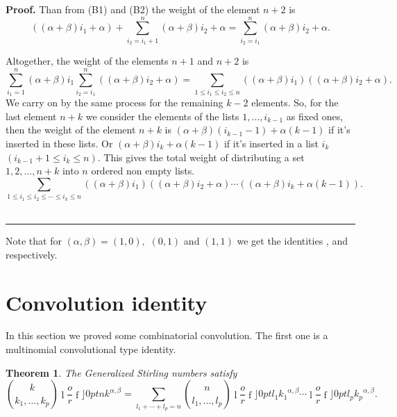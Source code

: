\documentclass{article}
\newcommand {\lah}[2]{\genfrac\lfloor \rfloor{0pt}{}{#1}{#2}}
\newtheorem{theorem}{Theorem}
\newenvironment{proof}[1][Proof]{\noindent\textbf{#1.} }{\ \rule{0.5em}{0.5em}}
\begin{document}
\begin{proof}
Than from (B1) and (B2) the weight of the element $n+2$ is
  \begin{equation*}
  \left( \left( \alpha +\beta \right) i_{1}+\alpha \right) +\sum_{i_{2}=i_{1}+1}^{n}\left( \alpha +\beta \right)i_{2}+\alpha= \sum_{i_{2}=i_{1}}^{n}\left( \alpha +\beta \right)i_{2}+\alpha.
  \end{equation*}


Altogether, the weight of the elements $n+1$ and $n+2$ is
\begin{equation*}
\sum_{i_{1}=1}^{n}\left(  \alpha +\beta \right) i_{1}\sum_{i_{2}=i_{1}}^{n}\left( \left( \alpha +\beta \right) i_{2}+\alpha
\right) =\sum_{1\leq i_{1}\leq i_{2}\leq n}\left( \left( \alpha
+\beta \right) i_{1}\right) \left( \left( \alpha +\beta \right) i_{2}+\alpha
\right).
\end{equation*}
We carry on by the same process for the remaining $k-2$ elements. So, for
the last element $n+k$ we consider the elements of the lists $1,\ldots
,i_{k-1}$ as fixed ones, then the weight of the element $n+k$ is  $\left( \alpha +\beta \right)
(i_{k-1}-1)+\alpha (k-1)$ if it's inserted in these lists. Or $\left( \alpha +\beta \right) i_{k}+\alpha (k-1)$
if it's inserted in a list $i_{k}$ $\left( i_{k-1}+1\leq i_{k}\leq n\right) $. This gives the total weight of distributing a set $1,2,\ldots,n+k$ into $n$ ordered non empty lists.
\begin{equation*}
\sum_{1\leq i_{1}\leq i_{2}\leq \cdots \leq i_{k}\leq n}\left( \left( \alpha
+\beta \right) i_{1}\right) \left( \left( \alpha +\beta \right) i_{2}+\alpha
\right) \cdots \left( \left( \alpha +\beta \right) i_{k}+\alpha \left(
k-1\right) \right).
\end{equation*}
\end{proof}

Note that for $\left( \alpha ,\beta \right) =\left( 1,0\right) ,$ $\left(
0,1\right) $ and $\left( 1,1\right) $ we get the identities \cite[eq. 22]%
{MR743795}, \cite[eq. 23]{MR743795} and \cite[eq. 5]{BelBou14} respectively.

\section{Convolution identity}
In this section we proved some combinatorial convolution. The first one is a multinomial convolutional type identity.
\begin{theorem}
The Generalized Stirling numbers satisfy%
\begin{equation*}
\binom{k}{k_{1},\ldots ,k_{p}}\lah{n}{k}^{\alpha ,\beta
}=\sum\limits_{l_{1}+\cdots +l_{p}=n}\binom{n}{l_{1},\ldots ,l_{p}}%
\lah{l_{1}}{k_{1}}^{\alpha ,\beta }\cdots \lah{l_{p}}{k_{p}}^{\alpha ,\beta }.
\end{equation*}
\end{theorem}
\end{document}
